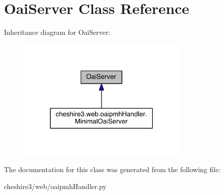 \hypertarget{class_oai_server}{\section{Oai\-Server Class Reference}
\label{class_oai_server}
}


Inheritance diagram for Oai\-Server\-:
\nopagebreak
\begin{figure}[H]
\begin{center}
\leavevmode
\includegraphics[width=234pt]{class_oai_server__inherit__graph}
\end{center}
\end{figure}


The documentation for this class was generated from the following file\-:\begin{DoxyCompactItemize}
\item 
cheshire3/web/oaipmh\-Handler.\-py\end{DoxyCompactItemize}

